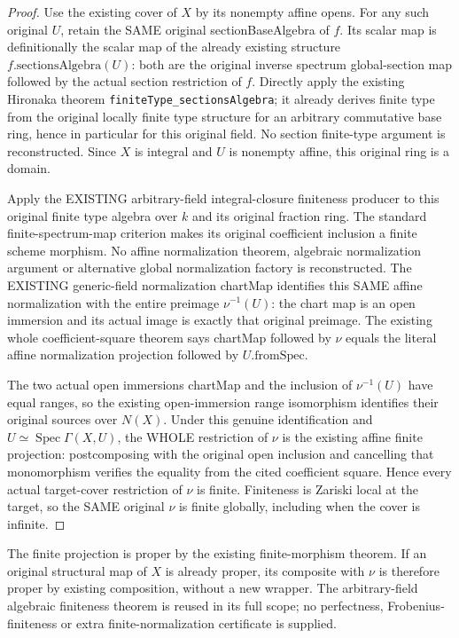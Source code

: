 \begin{proof}
Use the existing cover of $X$ by its nonempty affine opens. For any such original $U$, retain the SAME original sectionBaseAlgebra of $f$. Its scalar map is definitionally the scalar map of the already existing structure $f.\mathrm{sectionsAlgebra}(U)$: both are the original inverse spectrum global-section map followed by the actual section restriction of $f$. Directly apply the existing Hironaka theorem \texttt{finiteType\_sectionsAlgebra}; it already derives finite type from the original locally finite type structure for an arbitrary commutative base ring, hence in particular for this original field. No section finite-type argument is reconstructed. Since $X$ is integral and $U$ is nonempty affine, this original ring is a domain.

Apply the EXISTING arbitrary-field integral-closure finiteness producer to this original finite type algebra over $k$ and its original fraction ring. The standard finite-spectrum-map criterion makes its original coefficient inclusion a finite scheme morphism. No affine normalization theorem, algebraic normalization argument or alternative global normalization factory is reconstructed. The EXISTING generic-field normalization chartMap identifies this SAME affine normalization with the entire preimage $\nu^{-1}(U)$: the chart map is an open immersion and its actual image is exactly that original preimage. The existing whole coefficient-square theorem says chartMap followed by $\nu$ equals the literal affine normalization projection followed by $U.\mathrm{fromSpec}$.

The two actual open immersions chartMap and the inclusion of $\nu^{-1}(U)$ have equal ranges, so the existing open-immersion range isomorphism identifies their original sources over $N(X)$. Under this genuine identification and $U\simeq\operatorname{Spec}\Gamma(X,U)$, the WHOLE restriction of $\nu$ is the existing affine finite projection: postcomposing with the original open inclusion and cancelling that monomorphism verifies the equality from the cited coefficient square. Hence every actual target-cover restriction of $\nu$ is finite. Finiteness is Zariski local at the target, so the SAME original $\nu$ is finite globally, including when the cover is infinite.
\end{proof}

\begin{remark}
The finite projection is proper by the existing finite-morphism theorem. If an original structural map of $X$ is already proper, its composite with $\nu$ is therefore proper by existing composition, without a new wrapper. The arbitrary-field algebraic finiteness theorem is reused in its full scope; no perfectness, Frobenius-finiteness or extra finite-normalization certificate is supplied.
\end{remark}
